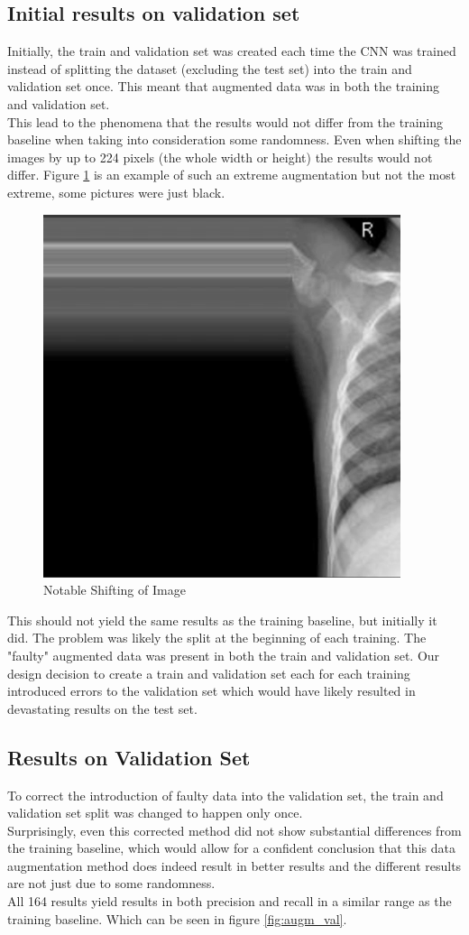 \subsection{Initial results on validation set}
Initially, the train and validation set was created each time the CNN was trained instead of splitting the dataset (excluding the test set) into the train and validation set once. This meant that augmented data was in both the training and validation set.\\
This lead to the phenomena that the results would not differ from the training baseline when taking into consideration some randomness. Even when shifting the images by up to 224 pixels (the whole width or height) the results would not differ. Figure \ref{fig:shift_img} is an example of such an extreme augmentation but not the most extreme, some pictures were just black.
\begin{figure}[h]
    \centering
    \includegraphics[width=0.4\linewidth]{figures/augmentation/faulty_image_example.png} 
    \caption{Notable Shifting of Image}
    \label{fig:shift_img}
\end{figure}
This should not yield the same results as the training baseline, but initially it did. The problem was likely the split at the beginning of each training. The "faulty" augmented data was present in both the train and validation set. Our design decision to create a train and validation set each for each training introduced errors to the validation set which would have likely resulted in devastating results on the test set.

\subsection{Results on Validation Set} 
To correct the introduction of faulty data into the validation set, the train and validation set split was changed to happen only once.\\
Surprisingly, even this corrected method did not show substantial differences from the training baseline, which would allow for a confident conclusion that this data augmentation method does indeed result in better results and the different results are not just due to some randomness. \\
All 164 results yield results in both precision and recall in a similar range as the training baseline. Which can be seen in figure \ref{fig:augm_val}.

